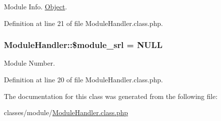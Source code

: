 Module Info. \hyperlink{classObject}{Object}. 



Definition at line 21 of file Module\+Handler.\+class.\+php.

\hypertarget{classModuleHandler_ad79751537e64d7bfc7dc6fa4280043b0}{}
\subsubsection[{\$module\+\_\+srl}]{\setlength{\rightskip}{0pt plus 5cm}Module\+Handler\+::\$module\+\_\+srl = N\+U\+L\+L}\label{classModuleHandler_ad79751537e64d7bfc7dc6fa4280043b0}


Module Number. 



Definition at line 20 of file Module\+Handler.\+class.\+php.



The documentation for this class was generated from the following file\+:\begin{DoxyCompactItemize}
\item 
classes/module/\hyperlink{ModuleHandler_8class_8php}{Module\+Handler.\+class.\+php}\end{DoxyCompactItemize}
